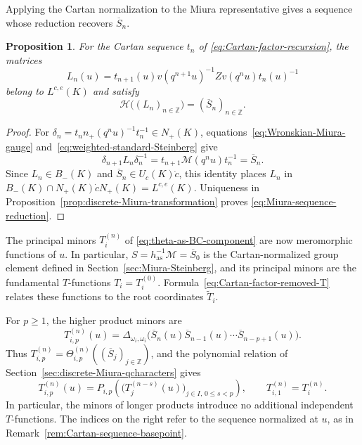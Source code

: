 \documentclass[11pt,leqno]{amsart}
\numberwithin{equation}{section}
\theoremstyle{plain}
\newtheorem{proposition}[theorem]{Proposition}
\theoremstyle{definition}
\theoremstyle{plain}
\theoremstyle{definition}
\theoremstyle{remark}
\begin{document}
Applying the Cartan normalization to the Miura representative gives a sequence whose reduction recovers $\overline S_n$.

\begin{proposition}\label{prop:differential-Miura-sequence}
For the Cartan sequence $t_n$ of \eqref{eq:Cartan-factor-recursion}, the matrices
\begin{equation}\label{eq:differential-Miura-sequence}
 L_n(u)=t_{n+1}(u)v(q^{n+1}u)^{-1}Zv(q^nu)t_n(u)^{-1}
\end{equation}
belong to $L^{c,e}(K)$ and satisfy
\begin{equation}\label{eq:Miura-sequence-reduction}
 \mathcal H\bigl((L_n)_{n\in\mathbb Z}\bigr)
     =(\overline S_n)_{n\in\mathbb Z}.
\end{equation}
\end{proposition}
\begin{proof}
For $\delta_n=t_n n_+(q^nu)^{-1}t_n^{-1}\in N_+(K)$, equations~\eqref{eq:Wronskian-Miura-gauge} and~\eqref{eq:weighted-standard-Steinberg} give
\[
 \delta_{n+1}L_n\delta_n^{-1}
 =t_{n+1}\mathscr M(q^nu)t_n^{-1}
 =\overline S_n.
\]
Since $L_n\in B_-(K)$ and $\overline S_n\in U_c(K)\dot c$, this identity places $L_n$ in $B_-(K)\cap N_+(K)\dot cN_+(K)=L^{c,e}(K)$.  Uniqueness in Proposition~\ref{prop:discrete-Miura-transformation} proves \eqref{eq:Miura-sequence-reduction}.
\end{proof}

The principal minors $T_i^{(n)}$ of \eqref{eq:theta-as-BC-component} are now meromorphic functions of $u$.  In particular, $S=h_{\mathrm{as}}^{-1}\mathscr M=\overline S_0$ is the Cartan-normalized group element defined in Section~\ref{sec:Miura-Steinberg}, and its principal minors are the fundamental $T$-functions $T_i=T_i^{(0)}$.  Formula~\eqref{eq:Cartan-factor-removed-T} relates these functions to the root coordinates $\widetilde T_i$.

For $p\ge1$, the higher product minors are
\begin{equation}\label{eq:FL-reindexed-theta}
 T_{i,p}^{(n)}(u)
 =\Delta_{\omega_i,\omega_i}\!\bigl(
       \overline S_n(u)\overline S_{n-1}(u)\cdots
                              \overline S_{n-p+1}(u)\bigr).
\end{equation}
Thus $T_{i,p}^{(n)}=\Theta_{i,p}^{(n)}((\overline S_j)_{j\in\mathbb Z})$, and the polynomial relation of Section~\ref{sec:discrete-Miura-qcharacters} gives
\[
 T_{i,p}^{(n)}(u)
 =P_{i,p}\!\left(
       \bigl(T_j^{(n-s)}(u)\bigr)_{j\in I,\,0\le s<p}
             \right),
 \qquad T_{i,1}^{(n)}=T_i^{(n)}.
\]
In particular, the minors of longer products introduce no additional independent $T$-functions.  The indices on the right refer to the sequence normalized at $u$, as in Remark~\ref{rem:Cartan-sequence-basepoint}.
\end{document}
